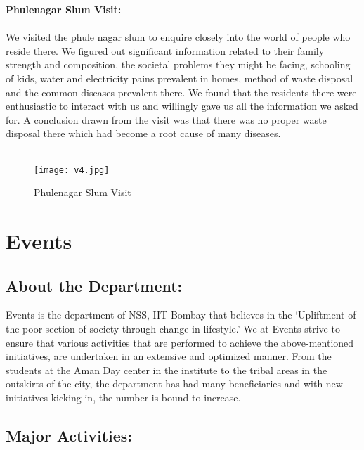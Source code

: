 \noindent \textbf{\Large \linebreak Phulenagar Slum Visit:}\\ \\
We visited the phule nagar slum to enquire closely into the world of people who reside there. We figured out significant information related to their family strength and composition, the societal problems they might be facing, schooling of kids, water and electricity pains prevalent in homes, method of waste disposal and the common diseases prevalent there. We found that the residents there were enthusiastic to interact with us and willingly gave us all the information we asked for. A conclusion drawn from the visit was that there was no proper waste disposal there which had become a root cause of many diseases.
\\ \\
\begin{figure}[H]
\centering
\texttt{[image: v4.jpg]}
\caption*{Phulenagar Slum Visit}
\end{figure}

\chapter*{Events}

\section*{\huge About the Department:} Events is the department of NSS, IIT Bombay that believes in the ‘Upliftment of the poor section of society through change in lifestyle.’ We at Events strive to ensure that various activities that are performed to achieve the above-mentioned initiatives, are undertaken in an extensive and optimized manner. From the students at the Aman Day center in the institute to the tribal areas in the outskirts of the city, the department has had many beneficiaries and with new initiatives kicking in, the number is bound to increase.

\section*{\huge Major Activities:}


